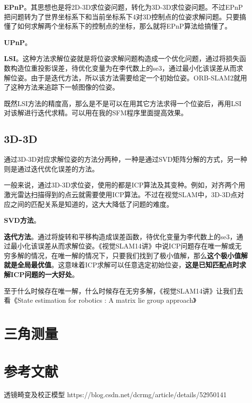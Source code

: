 \textbf{EPnP}。其思想也是将2D-3D求位姿问题，转化为3D-3D求位姿问题。不过EPnP把问题转为了世界坐标系下和当前坐标系下4对3D控制点的位姿求解问题。只要搞懂了如何求解两个坐标系下的控制点的坐标，那么就将EPnP算法给搞懂了。

\textbf{UPnP}。

\textbf{LSI}。这种方法求解位姿就是将位姿求解问题构造成一个优化问题，通过将损失函数构造位重投影误差，待优化变量为在李代数上的se3，通过最小化该误差从而求解位姿。由于是迭代方法，所以该方法需要给定一个初始位姿。ORB-SLAM2就用了这种方法来追踪下一帧图像的位姿。



\begin{note}
	既然LSI方法的精度高，那么是不是可以在用其它方法求得一个位姿后，再用LSI对该解进行迭代求精。可以用在我的SFM程序里面提高效果。
\end{note}


\subsection{3D-3D}

通过3D-3D对应求解位姿的方法分两种，一种是通过SVD矩阵分解的方式，另一种则是通过迭代优化误差的方法。

一般来说，通过3D-3D求位姿，使用的都是ICP算法及其变种。例如，对齐两个用激光雷达扫描得到的点云就需要使用ICP算法。不过在视觉SLAM中，3D-3D点对应之间的匹配关系是知道的，这大大降低了问题的难度。

\textbf{SVD方法}。


\textbf{迭代方法}。通过将旋转和平移构造成误差函数，待优化变量为李代数上的se3，通过最小化该误差从而求解位姿。《视觉SLAM14讲》中说ICP问题存在唯一解或无穷多解的情况，在唯一解的情况下，只要我们找到了极小值解，那么\textbf{这个极小值解就是全局最优值}。这意味着ICP求解可以任意选定初始位姿，\textbf{这是已知匹配点时求解ICP问题的一大好处}。

\begin{note}
	至于什么时候存在唯一解，什么时候存在无穷多解，《视觉SLAM14讲》让我们去看《State estimation for robotics : A matrix lie group approach》
\end{note}


\section{三角测量}




\section{参考文献}
透镜畸变及校正模型
https://blog.csdn.net/dcrmg/article/details/52950141


